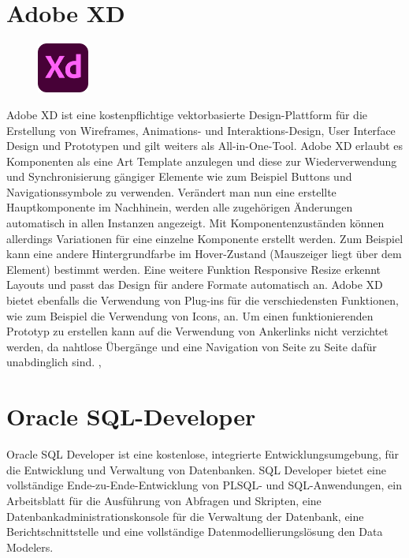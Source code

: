 \section{Adobe XD}
\begin{figure}
    \begin{center}
      \includegraphics[width=0.15\textwidth]{pics/XD_Logo.png}
    \end{center}
\end{figure}
Adobe XD ist eine kostenpflichtige vektorbasierte Design-Plattform für die Erstellung von Wireframes, Animations- und Interaktions-Design, 
User Interface Design und Prototypen und gilt weiters als All-in-One-Tool. Adobe XD erlaubt es Komponenten als eine Art Template anzulegen 
und diese zur Wiederverwendung und Synchronisierung gängiger Elemente wie zum Beispiel Buttons und Navigationssymbole zu verwenden.
Verändert man nun eine erstellte Hauptkomponente im Nachhinein, werden alle zugehörigen Änderungen automatisch in allen Instanzen angezeigt.
Mit Komponentenzuständen können allerdings Variationen für eine einzelne Komponente erstellt werden. Zum Beispiel kann eine andere 
Hintergrundfarbe im Hover-Zustand (Mauszeiger liegt über dem Element) bestimmt werden.
\newline
\newline
Eine weitere Funktion Responsive Resize erkennt Layouts und passt das Design für andere Formate automatisch an. Adobe XD bietet ebenfalls die Verwendung von Plug-ins für 
die verschiedensten Funktionen, wie zum Beispiel die Verwendung von Icons, an. Um einen funktionierenden Prototyp zu erstellen 
kann auf die Verwendung von Ankerlinks nicht verzichtet werden, da nahtlose Übergänge und eine Navigation von Seite zu Seite dafür unabdinglich sind. \cite{noauthor_adobe_nodate}, \cite{noauthor_was_nodate}

\section{Oracle SQL-Developer}
\label{chap:sqldeveloper}
Oracle SQL Developer ist eine kostenlose, integrierte Entwicklungsumgebung, für die 
Entwicklung und Verwaltung von Datenbanken. SQL Developer bietet eine vollständige 
Ende-zu-Ende-Entwicklung von PLSQL- und SQL-Anwendungen, ein Arbeitsblatt für die Ausführung von 
Abfragen und Skripten, eine Datenbankadministrationskonsole für die Verwaltung der Datenbank, eine 
Berichtschnittstelle und eine vollständige Datenmodellierungslösung den Data Modelers. \cite{noauthor_was_nodate-1}

